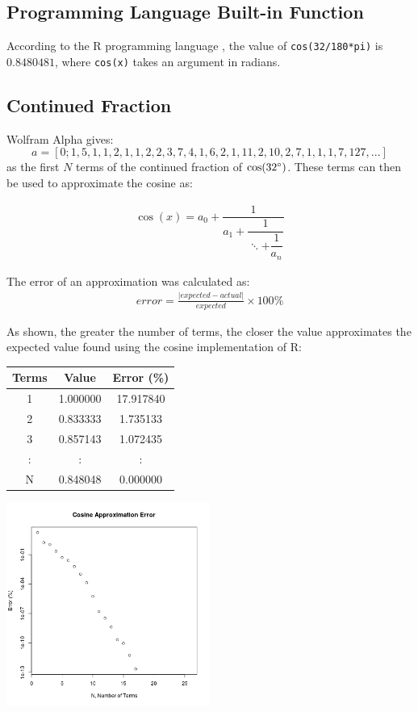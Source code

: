 \documentclass[12pt]{article}
\begin{document}
    \subsection{Programming Language Built-in Function}
      According to the R programming language \cite{R2015}, the value of
      {\tt{cos(32/180*pi)}} is \(0.8480481\), where {\tt{cos(x)}} takes an
      argument in radians.

    \subsection{Continued Fraction}
      Wolfram Alpha \cite{wolframalpha2015} gives:
      $$
      a = [0; 1, 5, 1, 1, 2, 1, 1, 2, 2, 3, 7, 4, 1, 6, 2, 1, 11, 2, 10, 2, 7,
        1, 1, 1, 7, 127, ...]
      $$
      as the first \(N\) terms of the continued fraction of \(\cos(32
      \degree)\). These terms can then be used to approximate the cosine as:

      \begin{align}
        \cos(x) = a_0 + \dfrac{1}{a_1 + \dfrac{1}{\ddots + \dfrac{1}{a_n}}}
      \end{align}

      The error of an approximation was calculated as:
      \begin{align}
        error = \frac{|expected - actual|}{expected} \times 100\%
      \end{align}

      As shown, the greater the number of terms, the closer the value
      approximates the expected value found using the cosine implementation of
      R:
      \begin{center}
        \begin{tabular}{|c||c|c|}
          \hline
          Terms & Value & Error (\%) \\
          \hline
          1 & 1.000000 & 17.917840 \\
          2 & 0.833333 & 1.735133 \\
          3 & 0.857143 & 1.072435 \\
          : & : & : \\
          N & 0.848048 & 0.000000 \\
          \hline
        \end{tabular}
      \end{center}
      \begin{center}
        \includegraphics[width=0.5\textwidth]{error}
      \end{center}
\end{document}
